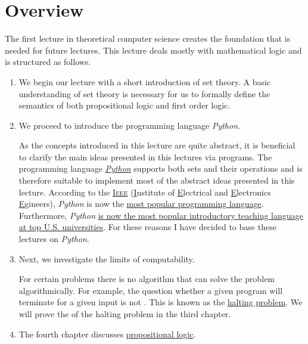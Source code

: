 \section{Overview} 
The first lecture in theoretical computer science creates the foundation that is needed for future lectures.
This lecture deals mostly with mathematical logic and is structured as follows.
\begin{enumerate}
\item We begin our lecture with a short introduction of set theory.  A basic understanding of set theory is
      necessary for us to formally define the semantics of both propositional logic and first order logic.
\item We proceed to introduce the programming language \textsl{Python}.

      As the concepts introduced in this lecture are quite abstract, it is beneficial to clarify the main
      ideas presented in this lectures via programs.  The programming language
      \href{http://python.org}{\textsl{Python}} supports both sets and their operations and is therefore
      suitable to implement most of the abstract ideas presented in this lecture.  According to the 
      \href{http://ieee.org}{\textsc{Ieee}} (\underline{I}nstitute of \underline{E}lectrical and
      \underline{E}lectronics \underline{E}gineers),  \textsl{Python} is now the 
      \href{https://spectrum.ieee.org/static/interactive-the-top-programming-languages-2018}{most popular programming language}.
      Furthermore, \textsl{Python}
      \href{http:https://cacm.acm.org/blogs/blog-cacm/176450-python-is-now-the-most-popular-introductory-teaching-language-at-top-u-s-universities/fulltext}{is
        now the most popular introductory teaching language at top U.S. universities}.   For these reasons I
      have decided to base these lectures on \textsl{Python}.

\item Next, we investigate the limits of computability.

      For certain problems there is no algorithm that can solve the problem algorithmically. 
      For example, the question whether a given program will terminate for a given input is not
      .  This is known as the \href{https://en.wikipedia.org/wiki/Halting_problem}{halting problem}.  
      We will prove the  of the halting problem in the third chapter. 
\item The fourth chapter discusses \href{https://en.wikipedia.org/wiki/Propositional_calculus}{propositional logic}.


\end{enumerate}
